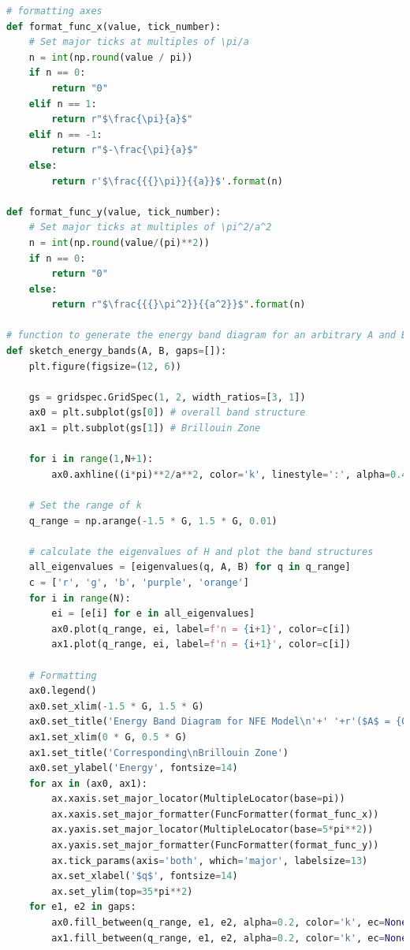 \documentclass[12pt,a4paper]{article}
\begin{document}
\begin{lstlisting}[language=Python, caption=Generation of Band Structures]
# formatting axes
def format_func_x(value, tick_number):
    # Set major ticks at multiples of \pi/a
    n = int(np.round(value / pi))
    if n == 0:
        return "0"
    elif n == 1:
        return r"$\frac{\pi}{a}$"
    elif n == -1:
        return r"$-\frac{\pi}{a}$"
    else:
        return r'$\frac{{{}\pi}}{{a}}$'.format(n)

def format_func_y(value, tick_number):
    # Set major ticks at multiples of \pi^2/a^2
    n = int(np.round(value/(pi)**2))
    if n == 0:
        return "0"
    else:
        return r"$\frac{{{}\pi^2}}{{a^2}}$".format(n)

# function to generate the energy band diagram for an arbitrary A and B
def sketch_energy_bands(A, B, gaps=[]):
    plt.figure(figsize=(12, 6))

    gs = gridspec.GridSpec(1, 2, width_ratios=[3, 1]) 
    ax0 = plt.subplot(gs[0]) # overall band structure
    ax1 = plt.subplot(gs[1]) # Brillouin Zone

    for i in range(1,N+1):
        ax0.axhline((i*pi)**2/a**2, color='k', linestyle=':', alpha=0.4)

    # Set the range of k
    q_range = np.arange(-1.5 * G, 1.5 * G, 0.01)

    # calculate the eigenvalues of H and plot the band structures
    all_eigenvalues = [eigenvalues(q, A, B) for q in q_range]
    c = ['r', 'g', 'b', 'purple', 'orange']
    for i in range(N):
        ei = [e[i] for e in all_eigenvalues]
        ax0.plot(q_range, ei, label=f'n = {i+1}', color=c[i])
        ax1.plot(q_range, ei, label=f'n = {i+1}', color=c[i])

    # Formatting
    ax0.legend()
    ax0.set_xlim(-1.5 * G, 1.5 * G)
    ax0.set_title('Energy Band Diagram for NFE Model\n'+' '+r'($A$ = {0}, $B$ = {1})'.format(A, B), fontsize=14)
    ax1.set_xlim(0 * G, 0.5 * G)
    ax1.set_title('Corresponding\nBrillouin Zone')
    ax0.set_ylabel('Energy', fontsize=14)
    for ax in (ax0, ax1):
        ax.xaxis.set_major_locator(MultipleLocator(base=pi))
        ax.xaxis.set_major_formatter(FuncFormatter(format_func_x))
        ax.yaxis.set_major_locator(MultipleLocator(base=5*pi**2))
        ax.yaxis.set_major_formatter(FuncFormatter(format_func_y))
        ax.tick_params(axis='both', which='major', labelsize=13)
        ax.set_xlabel('$q$', fontsize=14)
        ax.set_ylim(top=35*pi**2)
    for e1, e2 in gaps:
        ax0.fill_between(q_range, e1, e2, alpha=0.2, color='k', ec=None)
        ax1.fill_between(q_range, e1, e2, alpha=0.2, color='k', ec=None)
\end{lstlisting}
\end{document}
